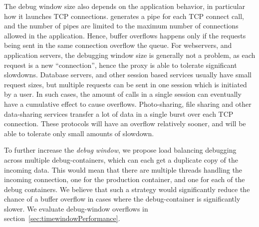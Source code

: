 The debug window size also depends on the application behavior, in particular how it launches TCP connections. 
\parikshan generates a pipe for each TCP connect call, and the number of pipes are limited to the maximum number of connections allowed in the application.
Hence, buffer overflows happens only if the requests being sent in the same connection overflow the queue.
For webservers, and application servers, the debugging window size is generally not a problem, as each request is a new ``connection'', hence the proxy is able to tolerate significant slowdowns.
Database servers, and other session based services usually have small request sizes, but multiple requests can be sent in one session which is initiated by a user. 
In such cases, the amount of calls in a single session can eventually have a cumulative effect to cause overflows.
Photo-sharing, file sharing and other data-sharing services transfer a lot of data in a single burst over each TCP connection. 
These protocols will have an overflow relatively sooner, and will be able to tolerate only small amounts of slowdown. 

To further increase the \emph{debug window}, we propose load balancing debugging across multiple debug-containers, which can each get a duplicate copy of the incoming data. 
This would mean that there are multiple threads handling the incoming connection, one for the production container, and one for each of the debug containers.
We believe that such a strategy would significantly reduce the chance of a buffer overflow in cases where the debug-container is significantly slower.
We evaluate debug-window overflows in section~\ref{sec:timewindowPerformance}.

